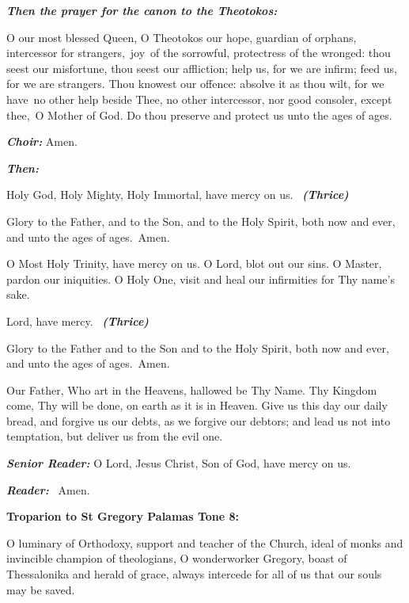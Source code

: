 \textbf{\emph{Then the prayer for the canon to the Theotokos:}}

O our most blessed Queen, O Theotokos our hope, guardian of orphans, intercessor for strangers,~joy~of the sorrowful, protectress of the wronged:
 thou seest our misfortune, thou seest our affliction; 
help us, for we are infirm; 
feed us, for we are strangers.
 Thou knowest our offence: 
absolve it as thou wilt, for we have~no other help beside Thee, no other intercessor, nor good consoler, except thee,~O Mother of God.
 Do thou preserve and protect us unto the ages of ages.

\textbf{\emph{Choir:}}
 Amen.


\textbf{\emph{Then:}}

Holy God, Holy Mighty, Holy Immortal, have mercy on us.
~\textbf{\emph{(Thrice)}}

Glory to the Father, and to the Son, and to the Holy Spirit, both now and ever, and unto the ages of ages.~Amen.

O Most Holy Trinity, have mercy on us. 
O Lord, blot out our sins. 
O Master, pardon our iniquities. 
O Holy One, visit and heal our infirmities for Thy name's sake.

Lord, have mercy.
~\textbf{\emph{(Thrice)}}

Glory to the Father and to the Son and to the Holy Spirit, both now and ever, and unto the ages of ages.~Amen.

Our Father, Who art in the Heavens, hallowed be Thy Name. 
Thy Kingdom come, Thy will be done, on earth as it is in Heaven. 
Give us this day our daily bread, and forgive us our debts, as we forgive our debtors;
and lead us not into temptation, but deliver us from the evil one.

\textbf{\emph{Senior Reader:}}
 O Lord, Jesus Christ, Son of God, have mercy on us.

\textbf{\emph{Reader:}}
~Amen.

\textbf{Troparion to St Gregory Palamas Tone 8:}

O luminary of Orthodoxy, support and teacher of the Church, ideal of monks and invincible champion of theologians, O wonderworker Gregory, boast of Thessalonika and herald of grace, always intercede for all of us that our souls may be saved.

